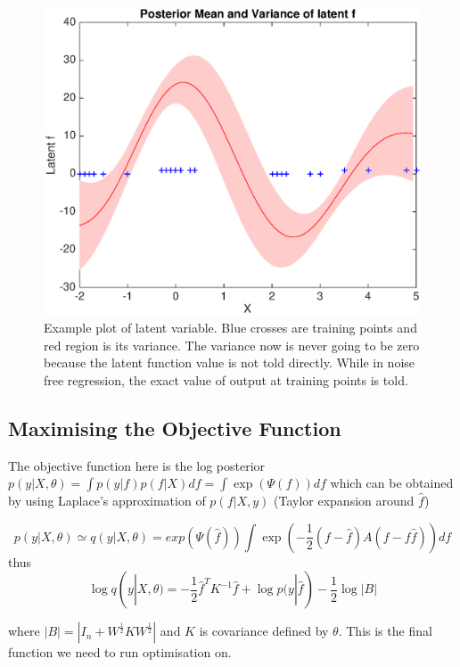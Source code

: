 \documentclass[11pt]{report}
\numberwithin{equation}{chapter}
\begin{document}
\begin{spacing}{2}
\begin{figure}
\centering
\includegraphics[scale=0.55]{classification_latent_f.eps}
\caption{Example plot of latent variable. Blue crosses are training points and red region is its variance. The variance now is never going to be zero because the latent function value is not told directly. While in noise free regression, the exact value of output at training points is told.}
\end{figure}

\subsection{Maximising the Objective Function}
The objective function here is the log posterior $p(y|X,\theta) = \int p(y|f)p(f|X) df = \int \operatorname{exp}(\Psi(f)) df$ which can be obtained by using Laplace's approximation of $p(f|X,y)$ (Taylor expansion around $\hat{f}$)

\begin{equation}
p(y|X,\theta) \simeq q(y|X,\theta) = exp(\Psi(\hat{f})) \int \operatorname{exp}(-\frac{1}{2}(f - \hat{f})A(f-f\hat{f})) df
\end{equation}
thus
\begin{equation}
\operatorname{log}q(y|X,\theta) = -\frac{1}{2}\hat{f}^TK^{-1}\hat{f} + \operatorname{log}p(y|\hat{f}) - \frac{1}{2}\operatorname{log}|B|
\label{eq:marg_likelihood_classification}
\end{equation}

where $|B| = |I_n + W^{\frac{1}{2}} K W^{\frac{1}{2}}|$ and $K$ is covariance defined by $\theta$. This is the final function we need to run optimisation on. 


\end{spacing}
\end{document}
